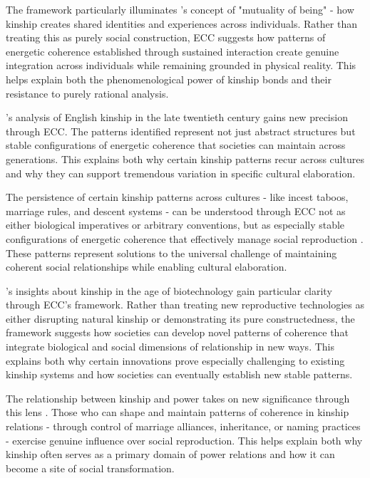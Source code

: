 \begin{refsection}
The framework particularly illuminates \cite{sahlins2013what}'s concept of "mutuality of being" - how kinship creates shared identities and experiences across individuals. Rather than treating this as purely social construction, ECC suggests how patterns of energetic coherence established through sustained interaction create genuine integration across individuals while remaining grounded in physical reality. This helps explain both the phenomenological power of kinship bonds and their resistance to purely rational analysis.

\cite{strathern1992after}'s analysis of English kinship in the late twentieth century gains new precision through ECC. The patterns identified represent not just abstract structures but stable configurations of energetic coherence that societies can maintain across generations. This explains both why certain kinship patterns recur across cultures and why they can support tremendous variation in specific cultural elaboration.

The persistence of certain kinship patterns across cultures - like incest taboos, marriage rules, and descent systems - can be understood through ECC not as either biological imperatives or arbitrary conventions, but as especially stable configurations of energetic coherence that effectively manage social reproduction \cite{godelier2011metamorphoses}. These patterns represent solutions to the universal challenge of maintaining coherent social relationships while enabling cultural elaboration.

\cite{franklin2013biological}'s insights about kinship in the age of biotechnology gain particular clarity through ECC's framework. Rather than treating new reproductive technologies as either disrupting natural kinship or demonstrating its pure constructedness, the framework suggests how societies can develop novel patterns of coherence that integrate biological and social dimensions of relationship in new ways. This explains both why certain innovations prove especially challenging to existing kinship systems and how societies can eventually establish new stable patterns.

The relationship between kinship and power takes on new significance through this lens \cite{yanagisako1995naturalizing}. Those who can shape and maintain patterns of coherence in kinship relations - through control of marriage alliances, inheritance, or naming practices - exercise genuine influence over social reproduction. This helps explain both why kinship often serves as a primary domain of power relations and how it can become a site of social transformation.


\end{refsection}
